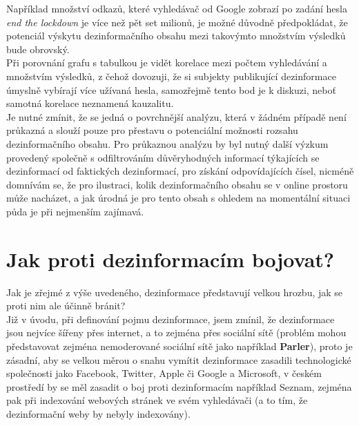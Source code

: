 Například množství odkazů, které vyhledávač od Google zobrazí po zadání hesla \textit{end the lockdown} je více než pět set milionů, je možné důvodně předpokládat, že potenciál výskytu dezinformačního obsahu mezi takovýmto množstvím výsledků bude obrovský.\\

Při porovnání grafu s tabulkou je vidět korelace mezi počtem vyhledávání a množstvím výsledků, z čehož dovozuji, že si subjekty publikující dezinformace úmyslně vybírají více užívaná hesla, samozřejmě tento bod je k diskuzi, neboť samotná korelace neznamená kauzalitu.\\

Je nutné zmínit, že se jedná o povrchnější analýzu, která v žádném případě není průkazná a slouží pouze pro přestavu o potenciální možnosti rozsahu dezinformačního obsahu. Pro průkaznou analýzu by byl nutný další výzkum provedený společně s odfiltrováním důvěryhodných informací týkajících se dezinformací od faktických dezinformací, pro získání odpovídajících čísel, nicméně domnívám se, že pro ilustraci, kolik dezinformačního obsahu se v online prostoru může nacházet, a jak úrodná je pro tento obsah s ohledem na momentální situaci půda je při nejmenším zajímavá.\\

\newpage

\section{Jak proti dezinformacím bojovat?}

Jak je zřejmé z výše uvedeného, dezinformace představují velkou hrozbu, jak se proti nim ale účinně bránit?\\

Již v úvodu, při definování pojmu dezinformace, jsem zmínil, že dezinformace jsou nejvíce šířeny přes internet, a to zejména přes sociální sítě (problém mohou představovat zejména nemoderované sociální sítě jako například \textbf{Parler}), proto je zásadní, aby se velkou měrou o snahu vymítit dezinformace zasadili technologické společnosti jako Facebook, Twitter, Apple či Google a Microsoft, v českém prostředí by se měl zasadit o boj proti dezinformacím například Seznam, zejména pak při indexování webových stránek ve svém vyhledávači (a to tím, že dezinformační weby by nebyly indexovány).\\

